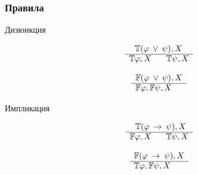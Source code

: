 \documentclass{beamer}
\newcommand{\signT}{\mathbb{T}}
\newcommand{\signF}{\mathbb{F}}
\begin{document}
\begin{frame}\frametitle{Правила}
Дизюнкция
\vspace{20px}
		\noindent\begin{minipage}{.5\linewidth}
		\begin{align*}
			\begin{array}{rl}
				& \:\:\: \signT(\varphi \: \vee \: \psi), X \\
			      \cline{2-2}
			      & \signT\varphi, X \:\:\:\:\:\:\:\: \signT\psi, X
			\end{array}
		\end{align*}
		\end{minipage}%
		\begin{minipage}{.5\linewidth}
		\begin{align*}
			\begin{array}{rl}
				& \signF(\varphi \: \vee \: \psi), X \\
			      \cline{2-2}
			      & \signF\varphi, \signF\psi, X
			\end{array}
		\end{align*}
		\end{minipage}
Импликация
		\noindent\begin{minipage}{.5\linewidth}
		\begin{align*}
			\begin{array}{rl}
				& \:\:\: \signT(\varphi \: \rightarrow \: \psi), X \\
			      \cline{2-2}
			      & \signF\varphi, X \:\:\:\:\:\:\:\: \signT\psi, X
			\end{array}
		\end{align*}
		\end{minipage}%
		\begin{minipage}{.5\linewidth}
		\begin{align*}
			\begin{array}{rl}
				& \signF(\varphi \: \rightarrow \: \psi), X \\
			      \cline{2-2}
			      & \signT\varphi, \signF\psi, X
			\end{array}
		\end{align*}
		\end{minipage}
\end{frame}
\end{document}
